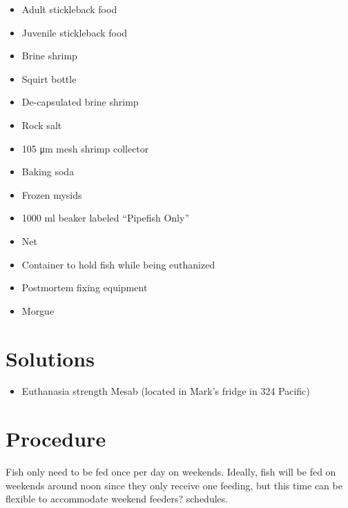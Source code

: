 \documentclass[
  letterpaper,
  DIV=11,
  numbers=noendperiod]{scrreprt}
\providecommand{\tightlist}{%
  \setlength{\itemsep}{0pt}\setlength{\parskip}{0pt}}\usepackage{longtable,booktabs,array}
\begin{document}
\begin{itemize}
\tightlist
\item
  Adult stickleback food
\item
  Juvenile stickleback food
\item
  Brine shrimp
\item
  Squirt bottle
\item
  De-capsulated brine shrimp
\item
  Rock salt
\item
  105 μm mesh shrimp collector
\item
  Baking soda
\item
  Frozen mysids
\item
  1000 ml beaker labeled ``Pipefish Only''
\item
  Net
\item
  Container to hold fish while being euthanized
\item
  Postmortem fixing equipment
\item
  Morgue
\end{itemize}

\hypertarget{solutions-36}{%
\section{Solutions}\label{solutions-36}}

\begin{itemize}
\tightlist
\item
  Euthanasia strength Mesab (located in Mark's fridge in 324 Pacific)
\end{itemize}

\hypertarget{procedure-46}{%
\section{Procedure}\label{procedure-46}}

\begin{tcolorbox}[enhanced jigsaw, toprule=.15mm, breakable, coltitle=black, leftrule=.75mm, title=\textcolor{quarto-callout-warning-color}{\faExclamationTriangle}\hspace{0.5em}{NOTES}, bottomrule=.15mm, toptitle=1mm, bottomtitle=1mm, colframe=quarto-callout-warning-color-frame, opacityback=0, colback=white, opacitybacktitle=0.6, colbacktitle=quarto-callout-warning-color!10!white, rightrule=.15mm, titlerule=0mm, arc=.35mm, left=2mm]

Fish only need to be fed once per day on weekends. Ideally, fish will be
fed on weekends around noon since they only receive one feeding, but
this time can be flexible to accommodate weekend feeders? schedules.

\end{tcolorbox}
\end{document}
